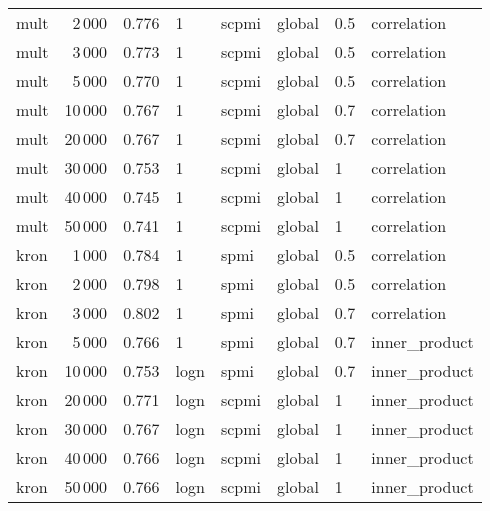 \begin{tabular}{lrrlllll}
    mult &            2\,000 &  0.776 &     1 &  scpmi &  global &  0.5 &    correlation \\
    mult &            3\,000 &  0.773 &     1 &  scpmi &  global &  0.5 &    correlation \\
    mult &            5\,000 &  0.770 &     1 &  scpmi &  global &  0.5 &    correlation \\
    mult &           10\,000 &  0.767 &     1 &  scpmi &  global &  0.7 &    correlation \\
    mult &           20\,000 &  0.767 &     1 &  scpmi &  global &  0.7 &    correlation \\
    mult &           30\,000 &  0.753 &     1 &  scpmi &  global &    1 &    correlation \\
    mult &           40\,000 &  0.745 &     1 &  scpmi &  global &    1 &    correlation \\
    mult &           50\,000 &  0.741 &     1 &  scpmi &  global &    1 &    correlation \\
    kron &            1\,000 &  0.784 &     1 &   spmi &  global &  0.5 &    correlation \\
    kron &            2\,000 &  0.798 &     1 &   spmi &  global &  0.5 &    correlation \\
    kron &            3\,000 &  0.802 &     1 &   spmi &  global &  0.7 &    correlation \\
    kron &            5\,000 &  0.766 &     1 &   spmi &  global &  0.7 &  inner\_product \\
    kron &           10\,000 &  0.753 &  logn &   spmi &  global &  0.7 &  inner\_product \\
    kron &           20\,000 &  0.771 &  logn &  scpmi &  global &    1 &  inner\_product \\
    kron &           30\,000 &  0.767 &  logn &  scpmi &  global &    1 &  inner\_product \\
    kron &           40\,000 &  0.766 &  logn &  scpmi &  global &    1 &  inner\_product \\
    kron &           50\,000 &  0.766 &  logn &  scpmi &  global &    1 &  inner\_product \\
\bottomrule
\end{tabular}
